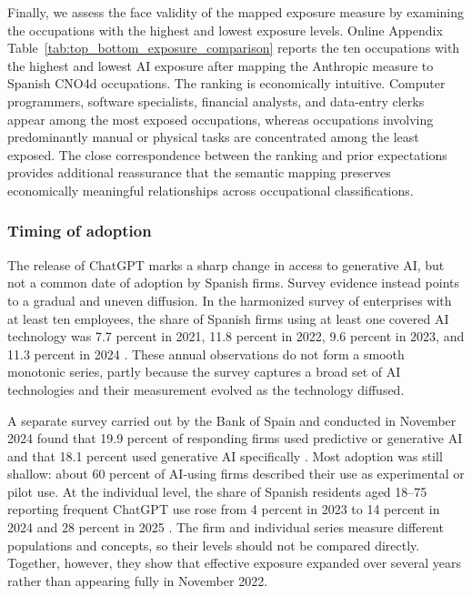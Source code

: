 Finally, we assess the face validity of the mapped exposure measure by examining the occupations with the highest and lowest exposure levels. Online Appendix Table~\ref{tab:top_bottom_exposure_comparison} reports the ten occupations with the highest and lowest AI exposure after mapping the Anthropic measure to Spanish CNO4d occupations. The ranking is economically intuitive. Computer programmers, software specialists, financial analysts, and data-entry clerks appear among the most exposed occupations, whereas occupations involving predominantly manual or physical tasks are concentrated among the least exposed. The close correspondence between the ranking and prior expectations provides additional reassurance that the semantic mapping preserves economically meaningful relationships across occupational classifications.

\subsubsection{Timing of adoption}
\label{sec:adoption_timing}

The release of ChatGPT marks a sharp change in access to generative AI, but not a common date of adoption by Spanish firms. Survey evidence instead points to a gradual and uneven diffusion. In the harmonized survey of enterprises with at least ten employees, the share of Spanish firms using at least one covered AI technology was 7.7 percent in 2021, 11.8 percent in 2022, 9.6 percent in 2023, and 11.3 percent in 2024 \citep{ontsi_ai_bigdata_2023,ontsi_ai_indicators_2024,bde_ai_adoption_2025}. These annual observations do not form a smooth monotonic series, partly because the survey captures a broad set of AI technologies and their measurement evolved as the technology diffused.

A separate survey carried out by the Bank of Spain and conducted in November 2024 found that 19.9 percent of responding firms used predictive or generative AI and that 18.1 percent used generative AI specifically \citep{bde_ai_adoption_2025}. Most adoption was still shallow: about 60 percent of AI-using firms described their use as experimental or pilot use. At the individual level, the share of Spanish residents aged 18--75 reporting frequent ChatGPT use rose from 4 percent in 2023 to 14 percent in 2024 and 28 percent in 2025 \citep{funcas_ai_survey_2026}. The firm and individual series measure different populations and concepts, so their levels should not be compared directly. Together, however, they show that effective exposure expanded over several years rather than appearing fully in November 2022.

